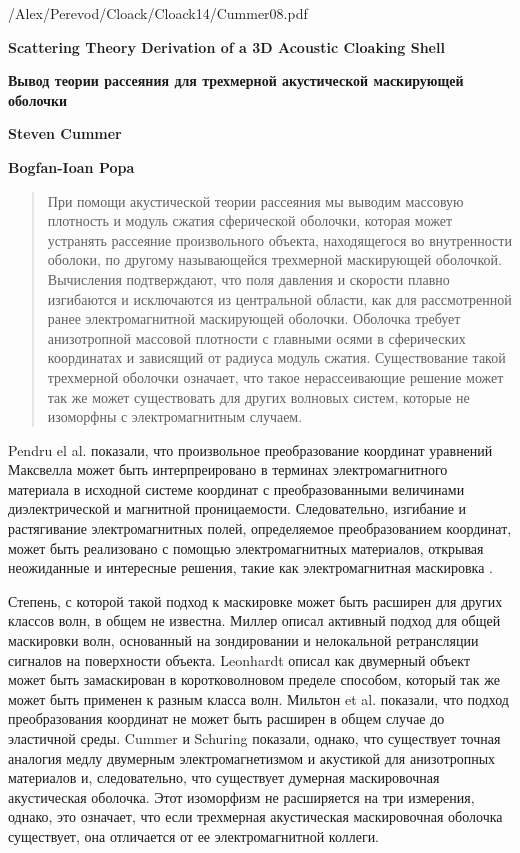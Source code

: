\documentclass[a4paper, 12pt]{article}
\newcommand{\tit}[1]{\begin{center}{\bf{\Large #1}}\end{center}}
\newcommand{\aut}[1]{\centerline{{\bf #1}}}
\begin{document}
/Alex/Perevod/Cloack/Cloack14/Cummer08.pdf

\sloppy
\tit{Scattering Theory Derivation of a 3D Acoustic Cloaking Shell}
\tit{Вывод теории рассеяния для трехмерной акустической маскирующей оболочки}
\aut{Steven Cummer}
\aut{Bogfan-Ioan Popa}

\begin{abstract}
При помощи акустической теории рассеяния мы выводим массовую плотность 
и модуль сжатия сферической оболочки, которая может устранять рассеяние 
произвольного объекта, находящегося во внутренности оболоки, по другому 
называющейся трехмерной  маскирующей оболочкой. 
Вычисления подтверждают, что поля давления и скорости 
плавно изгибаются и исключаются из центральной области, как для рассмотренной ранее
электромагнитной маскирующей оболочки. Оболочка требует анизотропной массовой 
плотности с главными осями в сферических координатах и зависящий от радиуса модуль
сжатия. Существование такой трехмерной оболочки означает, что такое нерассеивающие
решение может так же может существовать для других волновых систем, которые не 
изоморфны с электромагнитным случаем. 
\end{abstract}

Pendru el al. \cite{1} показали, что произвольное преобразование координат уравнений
Максвелла может быть интерпреировано в терминах электромагнитного материала в
исходной системе координат с преобразованными величинами диэлектрической и магнитной
проницаемости. Следовательно, изгибание и растягивание электромагнитных полей, 
определяемое преобразованием координат, 
может быть реализовано с помощью электромагнитных материалов, открывая неожиданные
и интересные решения, такие как электромагнитная маскировка \cite{1,2}.

Степень, с которой такой подход к маскировке может быть расширен для других 
классов волн, в общем не известна. Миллер \cite{3} описал активный подход для
общей маскировки волн, основанный на зондировании и нелокальной ретрансляции 
сигналов на поверхности объекта. Leonhardt \cite{4} описал как двумерный объект
может быть замаскирован в коротковолновом пределе способом, который так же может
быть применен к разным класса волн. Мильтон et al. \cite{5} показали, что 
подход преобразования координат не может быть расширен в общем случае до эластичной
среды. Cummer и Schuring \cite{6} показали, однако, что существует точная аналогия
медлу двумерным электромагнетизмом и акустикой для анизотропных материалов и, 
следовательно, что существует думерная маскировочная акустическая оболочка. 
Этот изоморфизм не расширяется на три измерения, однако, это означает, что если
трехмерная акустическая маскировочная оболочка существует, она отличается
от ее электромагнитной коллеги.
\end{document}
